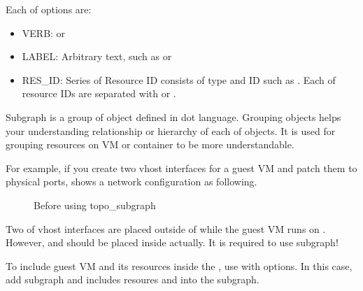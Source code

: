 \documentclass[a4paper,11pt,openany,oneside,english]{sphinxmanual}
\begin{document}
\begin{sphinxVerbatim}[commandchars=\\\{\},formatcom=\footnotesize]
\end{sphinxVerbatim}

Each of options are:
\begin{itemize}
\item {} 
VERB:  or 

\item {} 
LABEL: Arbitrary text, such as  or 

\item {} 
RES\_ID: Series of Resource ID consists of type and ID such as
. Each of resource IDs are separated with \sphinxcode{\sphinxupquote{,}} or
\sphinxcode{\sphinxupquote{;}}.

\end{itemize}

Subgraph is a group of object defined in dot language. Grouping objects
helps your understanding relationship or hierarchy of each of objects.
It is used for grouping resources on VM or container to be more
understandable.

For example, if you create two vhost interfaces for a guest VM and patch
them to physical ports,  shows a network configuration as
following.

\begin{figure}[htbp]
\centering
\capstart

\noindent{}
\caption{Before using topo\_subgraph}\label{\detokenize{commands/experimental:id2}}\label{\detokenize{commands/experimental:figure-topo-subg-before}}\end{figure}

Two of vhost interfaces are placed outside of  while the guest
VM runs on .
However,  and  should be placed inside 
actually. It is required to use subgraph!

To include guest VM and its resources inside the ,
use  with options.
In this case, add subgraph  and includes resoures
 and  into the subgraph.
\end{document}

